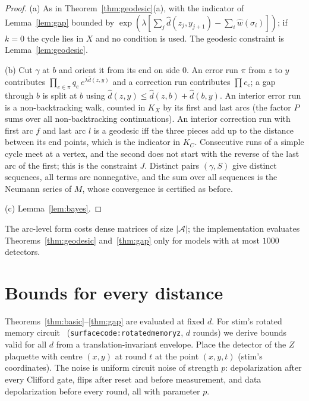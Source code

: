 \documentclass[11pt]{article}
\theoremstyle{plain}
\theoremstyle{definition}
\theoremstyle{remark}
\newcommand{\hw}{\hat w}
\newcommand{\hd}{\hat d}
\newcommand{\tsc}[1]{\texttt{#1}}
\renewcommand{\_}{\oldunderscore\allowbreak}
\begin{document}
\begin{proof}
(a) As in Theorem~\ref{thm:geodesic}(a), with the indicator of Lemma~\ref{lem:gap} bounded by $\exp(\lambda[\sum_j\hd(z_j,y_{j+1})-\sum_i\hw(\sigma_i)])$; if $k=0$ the cycle lies in $X$ and no condition is used. The geodesic constraint is Lemma~\ref{lem:geodesic}.

(b) Cut $\gamma$ at $b$ and orient it from its end on side $0$. An error run $\pi$ from $z$ to $y$ contributes $\prod_{e\in\pi}q_e\,e^{\lambda\hd(z,y)}$ and a correction run contributes $\prod c_e$; a gap through $b$ is split at $b$ using $\hd(z,y)\le\hd(z,b)+\hd(b,y)$. An interior error run is a non-backtracking walk, counted in $K_X$ by its first and last arcs (the factor $P$ sums over all non-backtracking continuations). An interior correction run with first arc $f$ and last arc $l$ is a geodesic iff the three pieces add up to the distance between its end points, which is the indicator in $K_C$. Consecutive runs of a simple cycle meet at a vertex, and the second does not start with the reverse of the last arc of the first; this is the constraint $J$. Distinct pairs $(\gamma,S)$ give distinct sequences, all terms are nonnegative, and the sum over all sequences is the Neumann series of $M$, whose convergence is certified as before.

(c) Lemma~\ref{lem:bayes}.
\end{proof}

\noindent The arc-level form costs dense matrices of size $|\mathcal A|$; the implementation evaluates Theorems~\ref{thm:geodesic} and~\ref{thm:gap} only for models with at most $1000$ detectors.

\section{Bounds for every distance}\label{sec:everyd}

Theorems~\ref{thm:basic}--\ref{thm:gap} are evaluated at fixed $d$. For stim's rotated memory circuit~\cite{stim} (\tsc{surface\_code:\allowbreak rotated\_memory\_z}, $d$ rounds) we derive bounds valid for all $d$ from a translation-invariant envelope. Place the detector of the $Z$ plaquette with centre $(x,y)$ at round $t$ at the point $(x,y,t)$ (stim's coordinates). The noise is uniform circuit noise of strength $p$: depolarization after every Clifford gate, flips after reset and before measurement, and data depolarization before every round, all with parameter $p$.
\end{document}

